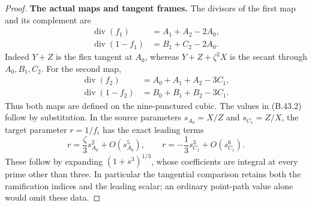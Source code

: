 \begin{proof}
\par\smallskip\noindent\textbf{The actual maps and tangent frames.}
The divisors of the first map and its complement are
\[
 \begin{split}
 \operatorname{div}(f_1)&=A_1+A_2-2A_0,\\
 \operatorname{div}(1-f_1)&=B_1+C_2-2A_0.
 \end{split}                                                \tag{B.43.3}
\]
Indeed $Y+Z$ is the flex tangent at $A_0$, whereas
$Y+Z+\zeta^2X$ is the secant through $A_0,B_1,C_2$.
For the second map,
\[
 \begin{split}
 \operatorname{div}(f_2)&=A_0+A_1+A_2-3C_1,\\
 \operatorname{div}(1-f_2)&=B_0+B_1+B_2-3C_1.
 \end{split}                                                \tag{B.43.4}
\]
Thus both maps are defined on the nine-punctured cubic.
The values in (B.43.2) follow by substitution.
In the source parameters $s_{A_0}=X/Z$ and $s_{C_1}=Z/X$,
the target parameter $r=1/f_i$ has the exact leading terms
\[
 r=\frac{\zeta}{3}s_{A_0}^{2}+O(s_{A_0}^{5}),\qquad
 r=-\frac13s_{C_1}^{3}+O(s_{C_1}^{6}).                       \tag{B.43.5}
\]
These follow by expanding $(1+s^3)^{1/3}$, whose coefficients
are integral at every prime other than three.  In particular
the tangential comparison retains both the ramification
indices and the leading scalar; an ordinary point-path
value alone would omit these data.


\end{proof}
